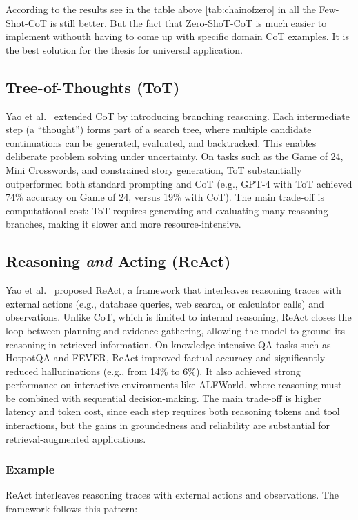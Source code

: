 According to the results see in the table above \ref{tab:chainofzero} in all the Few-Shot-CoT is still better. But the fact that Zero-ShoT-CoT is much easier to implement withouth having to come up with specific domain CoT examples. It is the best solution for the thesis for universal application.


\subsection{Tree-of-Thoughts (ToT)}
Yao et al.~\cite{treeofthought} extended CoT by introducing branching reasoning. Each intermediate step (a ``thought'') forms part of a search tree, where multiple candidate continuations can be generated, evaluated, and backtracked. This enables deliberate problem solving under uncertainty. On tasks such as the Game of 24, Mini Crosswords, and constrained story generation, ToT substantially outperformed both standard prompting and CoT (e.g., GPT-4 with ToT achieved 74\% accuracy on Game of 24, versus 19\% with CoT). The main trade-off is computational cost: ToT requires generating and evaluating many reasoning branches, making it slower and more resource-intensive.

\subsection{Reasoning \emph{and} Acting (ReAct)}
Yao et al.~\cite{react} proposed ReAct, a framework that interleaves reasoning traces with external actions (e.g., database queries, web search, or calculator calls) and observations. Unlike CoT, which is limited to internal reasoning, ReAct closes the loop between planning and evidence gathering, allowing the model to ground its reasoning in retrieved information. On knowledge-intensive QA tasks such as HotpotQA and FEVER, ReAct improved factual accuracy and significantly reduced hallucinations (e.g., from 14\% to 6\%). It also achieved strong performance on interactive environments like ALFWorld, where reasoning must be combined with sequential decision-making. The main trade-off is higher latency and token cost, since each step requires both reasoning tokens and tool interactions, but the gains in groundedness and reliability are substantial for retrieval-augmented applications.

\subsubsection{Example}
ReAct interleaves reasoning traces with external actions and observations. The framework follows this pattern:

